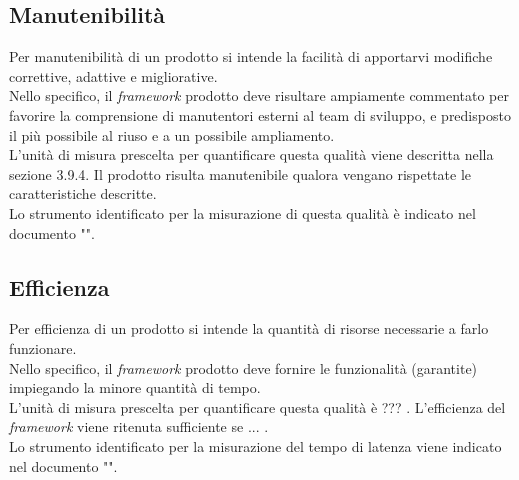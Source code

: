 	\subsection{Manutenibilità}
		Per manutenibilità di un prodotto si intende la facilità di apportarvi modifiche correttive, adattive e migliorative.\\
		Nello specifico, il \textit{framework} prodotto deve risultare ampiamente commentato per favorire la comprensione di manutentori esterni al team di sviluppo, e predisposto il più possibile al riuso e a un possibile ampliamento.\\
		L'unità di misura prescelta per quantificare questa qualità viene descritta nella sezione 3.9.4. Il prodotto risulta manutenibile qualora vengano rispettate le caratteristiche descritte.\\
		Lo strumento identificato per la misurazione di questa qualità è indicato nel documento "".
	\subsection{Efficienza}
		Per efficienza di un prodotto si intende la quantità di risorse necessarie a farlo funzionare.\\
		Nello specifico, il \textit{framework} prodotto deve fornire le funzionalità (garantite) impiegando la minore quantità di tempo.\\
		L'unità di misura prescelta per quantificare questa qualità è ??? . L'efficienza del \textit{framework} viene ritenuta sufficiente se ... .\\
		Lo strumento identificato per la misurazione del tempo di latenza viene indicato nel documento "".